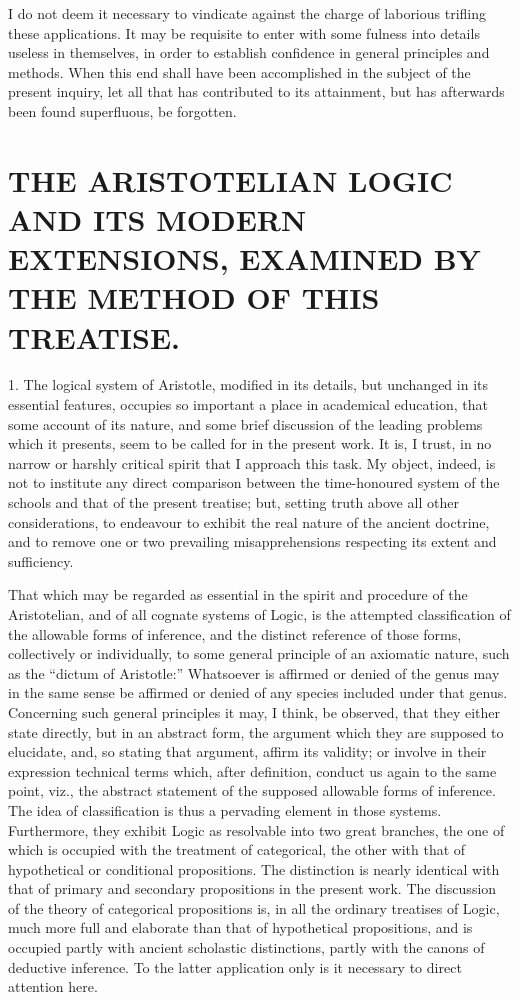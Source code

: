 \documentclass[oneside]{book}
\begin{document}
I do not deem it necessary to vindicate against the charge of
laborious trifling these applications. It may be requisite to enter
with some fulness into details useless in themselves, in order
to establish confidence in general principles and methods. When
this end shall have been accomplished in the subject of the present
inquiry, let all that has contributed to its attainment, but
has afterwards been found superfluous, be forgotten.

\chapter[ARISTOTELIAN LOGIC]{\large THE ARISTOTELIAN LOGIC AND ITS
MODERN EXTENSIONS, EXAMINED BY THE METHOD OF THIS TREATISE.}

1. The logical system of Aristotle, modified in its details,
but unchanged in its essential features, occupies so important
a place in academical education, that some account of its
nature, and some brief discussion of the leading problems which
it presents, seem to be called for in the present work. It is, I
trust, in no narrow or harshly critical spirit that I approach this
task. My object, indeed, is not to institute any direct comparison
between the time-honoured system of the schools and that
of the present treatise; but, setting truth above all other considerations,
to endeavour to exhibit the real nature of the ancient
doctrine, and to remove one or two prevailing misapprehensions
respecting its extent and sufficiency.

That which may be regarded as essential in the spirit and
procedure of the Aristotelian, and of all cognate systems of Logic,
is the attempted classification of the allowable forms of inference,
and the distinct reference of those forms, collectively or individually,
to some general principle of an axiomatic nature, such as
the ``dictum of Aristotle:'' Whatsoever is affirmed or denied of
the genus may in the same sense be affirmed or denied of any
species included under that genus. Concerning such general
principles it may, I think, be observed, that they either state directly,
but in an abstract form, the argument which they are
supposed to elucidate, and, so stating that argument, affirm its
validity; or involve in their expression technical terms which,
after definition, conduct us again to the same point, viz.,
the abstract statement of the supposed allowable forms of inference.
The idea of classification is thus a pervading element
in those systems. Furthermore, they exhibit Logic as resolvable
into two great branches, the one of which is occupied with the
treatment of categorical, the other with that of hypothetical or
conditional propositions. The distinction is nearly identical with
that of primary and secondary propositions in the present work.
The discussion of the theory of categorical propositions is, in all
the ordinary treatises of Logic, much more full and elaborate than
that of hypothetical propositions, and is occupied partly with
ancient scholastic distinctions, partly with the canons of deductive
inference. To the latter application only is it necessary to
direct attention here.
\end{document}
